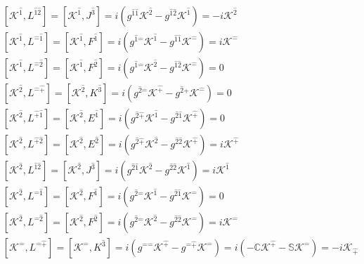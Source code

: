 \documentclass[]{article}
\numberwithin{equation}{section}
\begin{document}
\begin{align}
    &\left[\mathcal{K}^{\hat{1}},L^{\hat{1}\hat{2}}\right]=\left[\mathcal{K}^{\hat{1}},J^{\hat{3}}\right]=i\left(g^{\hat{1}\hat{1}}\mathcal{K}^{\hat{2}}-g^{\hat{1}\hat{2}}\mathcal{K}^{\hat{1}}\right)=-i\mathcal{K}^{\hat{2}}\\
    &\left[\mathcal{K}^{\hat{1}},L^{\hat{-}\hat{1}}\right]=\left[\mathcal{K}^{\hat{1}},F^{\hat{1}}\right]=i\left(g^{\hat{1}\hat{-}}\mathcal{K}^{\hat{1}}-g^{\hat{1}\hat{1}}\mathcal{K}^{\hat{-}}\right)=i\mathcal{K}^{\hat{-}}\\
    &\left[\mathcal{K}^{\hat{1}},L^{\hat{-}\hat{2}}\right]=\left[\mathcal{K}^{\hat{1}},F^{\hat{2}}\right]=i\left(g^{\hat{1}\hat{-}}\mathcal{K}^{\hat{2}}-g^{\hat{1}\hat{2}}\mathcal{K}^{\hat{-}}\right)=0\\
    &\left[\mathcal{K}^{\hat{2}},L^{\hat{-}\hat{+}}\right]=\left[\mathcal{K}^{\hat{2}},K^{\hat{3}}\right]=i\left(g^{\hat{2}\hat{-}}\mathcal{K}^{\hat{+}}-g^{\hat{2}\hat{+}}\mathcal{K}^{\hat{-}}\right)=0\\
    &\left[\mathcal{K}^{\hat{2}},L^{\hat{+}\hat{1}}\right]=\left[\mathcal{K}^{\hat{2}},E^{\hat{1}}\right]=i\left(g^{\hat{2}\hat{+}}\mathcal{K}^{\hat{1}}-g^{\hat{2}\hat{1}}\mathcal{K}^{\hat{+}}\right)=0\\
    &\left[\mathcal{K}^{\hat{2}},L^{\hat{+}\hat{2}}\right]=\left[\mathcal{K}^{\hat{2}},E^{\hat{2}}\right]=i\left(g^{\hat{2}\hat{+}}\mathcal{K}^{\hat{2}}-g^{\hat{2}\hat{2}}\mathcal{K}^{\hat{+}}\right)=i\mathcal{K}^{\hat{+}}\\
    &\left[\mathcal{K}^{\hat{2}},L^{\hat{1}\hat{2}}\right]=\left[\mathcal{K}^{\hat{2}},J^{\hat{3}}\right]=i\left(g^{\hat{2}\hat{1}}\mathcal{K}^{\hat{2}}-g^{\hat{2}\hat{2}}\mathcal{K}^{\hat{1}}\right)=i\mathcal{K}^{\hat{1}}\\
    &\left[\mathcal{K}^{\hat{2}},L^{\hat{-}\hat{1}}\right]=\left[\mathcal{K}^{\hat{2}},F^{\hat{1}}\right]=i\left(g^{\hat{2}\hat{-}}\mathcal{K}^{\hat{1}}-g^{\hat{2}\hat{1}}\mathcal{K}^{\hat{-}}\right)=0\\
    &\left[\mathcal{K}^{\hat{2}},L^{\hat{-}\hat{2}}\right]=\left[\mathcal{K}^{\hat{2}},F^{\hat{2}}\right]=i\left(g^{\hat{2}\hat{-}}\mathcal{K}^{\hat{2}}-g^{\hat{2}\hat{2}}\mathcal{K}^{\hat{-}}\right)=i\mathcal{K}^{\hat{-}}\\
    &\left[\mathcal{K}^{\hat{-}},L^{\hat{-}\hat{+}}\right]=\left[\mathcal{K}^{\hat{-}},K^\hat{3}\right]=i\left(g^{\hat{-}\hat{-}}\mathcal{K}^{\hat{+}}-g^{\hat{-}\hat{+}}\mathcal{K}^{\hat{-}}\right)=i\left(-\mathbb{C}\mathcal{K}^{\hat{+}}-\mathbb{S}\mathcal{K}^{\hat{-}}\right)=-i\mathcal{K}_{\hat{+}}\\

\end{align}
\end{document}

